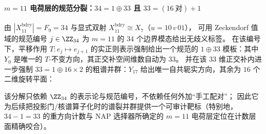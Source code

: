\paragraph{\texorpdfstring{$m=11$}{m=11} 电荷层的规范分裂：\texorpdfstring{$34=1\oplus 33$}{34=1+33} 且 \texorpdfstring{$33=(16\ \text{对})+1$}{33=(16 pairs)+1}}
由 \(|X_{11}^{\mathrm{bdry}}|=F_9=34\) 与显式双射 \(X_{11}^{\mathrm{bdry}}\cong X_7\)（\(u=10\,v\,01\)），
可用 Zeckendorf 值域的规范编号 \(j\in\ZZ_{34}\) 为 \(m=11\) 的 \(34\) 个边界模态给出无歧义标签。
在该编号下，平移作用 \(T:e_j\mapsto e_{j+1}\) 的实正则表示强制给出一个规范的 \(1\oplus 33\) 模板：其中 \(Y_0\) 是唯一的 \(T\)-不变方向，其正交补空间维数自动为 \(33\)。
并在该 \(33\) 维正交补内进一步强制 \(33=1\oplus 16\times 2\) 的粗谱并群：\(Y_{17}\) 给出唯一自共轭实方向，其余为 \(16\) 个二维旋转平面：

该分解只依赖 \(\ZZ_{34}\) 的表示论与规范编号，不依赖任何外加“手工配对”；
因此它为后续把投影门/核谱算子化时的谱裂并群提供一个可审计靶标（特别地，\(34-1=33\) 的重方向计数与 NAP 选择器所确定的 \(m=11\) 电荷层定位在计数层面精确咬合）。
